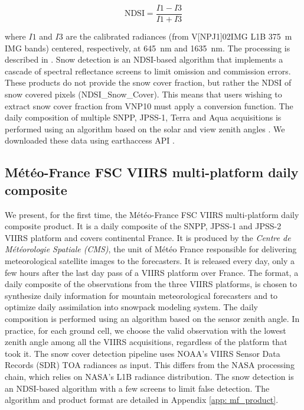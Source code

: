 \documentclass[tc, manuscript]{copernicus}
\begin{document}
\begin{equation}
    \mathrm{NDSI} = \frac{I1-I3}{I1+I3}
    \label{eq: ndsi}
\end{equation}

where $I1$ and $I3$ are the calibrated radiances (from V[NP\textbar J1]02IMG L1B 375~m IMG bands) centered, respectively, at 645~nm and 1635~nm. The processing is described in \citep{riggs2021MODISAquaSnow, riggs2025MODISTerraSnow}. Snow detection is an NDSI-based algorithm that implements a cascade of spectral reflectance screens to limit omission and commission errors. %
These products do not provide the snow cover fraction, but rather the NDSI of snow covered pixels (NDSI\_Snow\_Cover). This means that users wishing to extract snow cover fraction from VNP10 must apply a conversion function. The daily composition of multiple SNPP, JPSS-1, Terra and Aqua acquisitions is performed using an algorithm  based on the solar and view zenith angles \citep{riggs2023viirs, riggs2025MODISTerraSnow}. We downloaded these data using earthaccess API \citep{barrett_2026_18435881}.

\subsection{Météo-France FSC VIIRS multi-platform daily composite}
\label{subsec: data_meteofrance}
We present, for the first time, the Météo-France FSC VIIRS multi-platform daily composite product. It is a daily composite of the SNPP, JPSS-1 and JPSS-2 VIIRS platform and covers continental France. It is produced by the
\textit{Centre de Météorologie Spatiale (CMS)}, the unit of Météo France responsible for delivering meteorological satellite images to the forecasters. It is released every day, only a few hours after the last day pass of a VIIRS platform over France. The format, a daily composite of the observations from the three VIIRS platforms, is chosen to synthesize daily information for mountain meteorological forecasters and to optimize daily assimilation into snowpack modeling system. The daily composition is performed using an algorithm based on the sensor zenith angle. In practice, for each ground cell, we choose the valid observation with the lowest zenith angle among all the VIIRS acquisitions, regardless of the platform that took it. The snow cover detection pipeline uses NOAA's VIIRS Sensor Data Records (SDR) TOA radiances as input. This differs from the NASA processing chain, which relies on NASA's L1B radiance distribution. The snow detection is an NDSI-based algorithm with a few screens to limit false detection. The algorithm and product format are detailed in Appendix \ref{app: mf_product}. 
\end{document}
